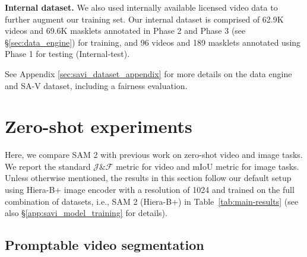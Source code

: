 \documentclass[]{fairmeta}
\renewcommand{\paragraph}[1]{\vspace{1.25mm}\noindent\textbf{#1}}
\newcommand{\secref}[1]{\S\ref{#1}}
\newcommand{\tabref}[1]{Table~\ref{#1}}
\newcommand{\internnumvideos}{62.9K\xspace}  %
\newcommand{\internnummasklets}{69.6K\xspace}  %
\renewcommand{\paragraph}[1]{\vspace{1.25mm}\noindent\textbf{#1}}
\begin{document}
\paragraph{Internal dataset.} We also used internally available licensed video data to further augment our training set. Our internal dataset is comprised of \internnumvideos videos and \internnummasklets masklets annotated in Phase 2 and Phase 3 (see \secref{sec:data_engine}) for training, and 96 videos and 189 masklets annotated using Phase 1 for testing (Internal-test). %

See Appendix \ref{sec:savi_dataset_appendix} for more details on the data engine and SA-V dataset, including a fairness evaluation.

\begin{table}[t]
\vspace{-10pt}
    
    \vspace{-5pt}
    \caption{Comparison of our datasets with open source VOS datasets in terms of number of videos, duration, number of masklets, masks, frames, and disappearance rate. SA-V Manual contains only manually annotated labels. SA-V Manual+Auto combines manually annotated labels with automatically generated masklets.}
    \label{tab:dataset-stats-comp}
    \vspace{-10pt}
\end{table}


\section{Zero-shot experiments}
\label{sec:zero_shot_experiments}

Here, we compare SAM 2 with previous work on zero-shot video and image tasks. We report the standard $\mathcal{J}\&\mathcal{F}$ metric \citep{Pont-Tuset_arXiv_2017} for video and mIoU metric for image tasks. 
Unless otherwise mentioned, the results in this section follow our default setup using Hiera-B+ image encoder with a resolution of 1024 and trained on the full combination of datasets, i.e., SAM 2 (Hiera-B+) in \tabref{tab:main-results} (see also \secref{app:savi_model_training} for details).


\subsection{Promptable video segmentation}
\label{sec:eval_sz:pvs}
\end{document}
